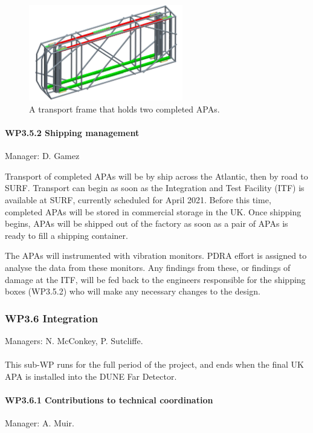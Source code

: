 \begin{figure}
    \centering
    \includegraphics[width=0.6\textwidth]{figs/WP3/APATransportFrame.png}
    \caption{A transport frame that holds two completed APAs.}
    \label{fig:TransportFrame}
\end{figure}

\paragraph{WP3.5.2 Shipping management} Manager: D. Gamez

Transport of completed APAs will be by ship across the Atlantic, then by road to SURF. Transport can begin as soon as the Integration and Test Facility (ITF) is available at SURF, currently scheduled for April 2021. Before this time, completed APAs will be stored in commercial storage in the UK. Once shipping begins, APAs will be shipped out of the factory as soon as a pair of APAs is ready to fill a shipping container.

The APAs will instrumented with vibration monitors. PDRA effort is assigned to analyse the data from these monitors. Any findings from these, or findings of damage at the ITF, will be fed back to the engineers responsible for the shipping boxes (WP3.5.2) who will make any necessary changes to the design.

\subsubsection{WP3.6 Integration}
Managers: N. McConkey, P. Sutcliffe.\\
\\ This sub-WP runs for the full period of the project, and ends when the final UK APA is installed into the DUNE Far Detector.

\paragraph{WP3.6.1 Contributions to technical coordination} Manager: A. Muir.


